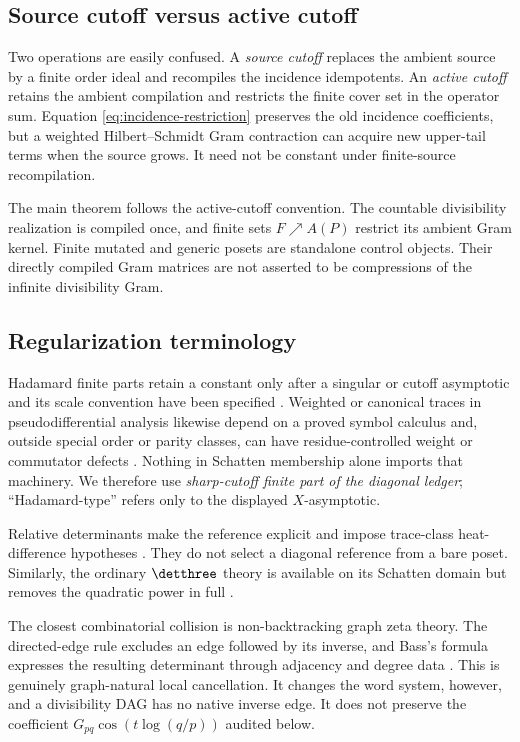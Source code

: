 \subsection{Source cutoff versus active cutoff}

Two operations are easily confused.  A \emph{source cutoff} replaces the
ambient source by a finite order ideal and recompiles the incidence
idempotents.  An \emph{active cutoff} retains the ambient compilation and
restricts the finite cover set in the operator sum.  Equation
\eqref{eq:incidence-restriction} preserves the old incidence coefficients,
but a weighted Hilbert--Schmidt Gram contraction can acquire new upper-tail
terms when the source grows.  It need not be constant under finite-source
recompilation.

The main theorem follows the active-cutoff convention.  The countable
divisibility realization is compiled once, and finite sets
$F\nearrow A(P)$ restrict its ambient Gram kernel.  Finite mutated and generic
posets are standalone control objects.  Their directly compiled Gram matrices
are not asserted to be compressions of the infinite divisibility Gram.

\subsection{Regularization terminology}

Hadamard finite parts retain a constant only after a singular or cutoff
asymptotic and its scale convention have been specified
\citep{BlanchetFaye2000,EstradaKanwal1989}.  Weighted or canonical traces in
pseudodifferential analysis likewise depend on a proved symbol calculus and,
outside special order or parity classes, can have residue-controlled weight
or commutator defects \citep{KontsevichVishik1994,Grubb2005,CardonaEtAl2003}.
Nothing in Schatten membership alone imports that machinery.  We therefore
use \emph{sharp-cutoff finite part of the diagonal ledger}; ``Hadamard-type''
refers only to the displayed $X$-asymptotic.

Relative determinants make the reference explicit and impose trace-class
heat-difference hypotheses \citep{Muller1998}.  They do not select a diagonal
reference from a bare poset.  Similarly, the ordinary $\detthree$ theory is
available on its Schatten domain but removes the quadratic power in full
\citep{Simon2005,BritzEtAl2021}.

The closest combinatorial collision is non-backtracking graph zeta theory.
The directed-edge rule excludes an edge followed by its inverse, and Bass's
formula expresses the resulting determinant through adjacency and degree
data \citep{Hashimoto1989,Bass1992}.  This is genuinely graph-natural local
cancellation.  It changes the word system, however, and a divisibility DAG
has no native inverse edge.  It does not preserve the coefficient
$G_{pq}\cos(t\log(q/p))$ audited below.

